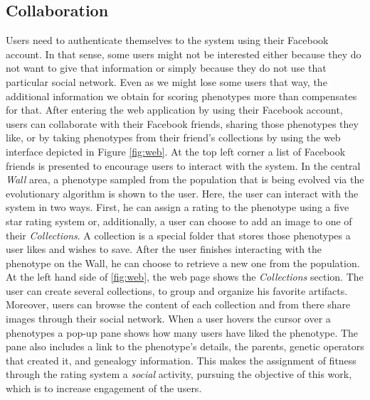 \subsection{Collaboration}
\label{sec:col}
Users need to authenticate themselves to the system using their
Facebook account. In that sense, some users might not be interested
either because they do not want to give that information or simply because
they do not use that particular social network. Even as we might lose
some users that way, the additional information we obtain for scoring
phenotypes more than compensates for that. %
After entering the web application by using their Facebook account,
users can collaborate with their Facebook friends, 
sharing those phenotypes they like, or by taking phenotypes
from their friend's collections by using the web interface depicted 
in Figure \ref{fig:web}.
At the top left corner a list of Facebook friends is presented
to encourage users to interact with the system. In the central 
\emph{ Wall } area, a phenotype sampled from the population that is
being evolved via the evolutionary algorithm 
is shown to the user.
Here, the user can interact with the system in two ways.
First, he can assign a rating %
 to the phenotype using
a five star rating system or,
additionally, a user can choose to add an image to one of their \emph{Collections}.
A collection is a special folder that stores those phenotypes a user likes and wishes
to save. After the user finishes interacting with the phenotype
on the Wall, he can choose to retrieve a new one from the population.
At the left hand side of \ref{fig:web}, the web page shows the \emph{Collections} section.
The user can create several collections, to group and organize his favorite 
artifacts. Moreover, users can browse the content of each collection and from
there share images through their social network.
When a user hovers the cursor over a phenotypes a pop-up pane shows how many users have
liked the phenotype. The pane also includes a link to the phenotype's 
details, the parents, genetic operators that created it, and genealogy
information. This makes the assignment of fitness through the rating
system a {\em social} activity, pursuing the objective of this work,
which is to increase engagement of the users.
